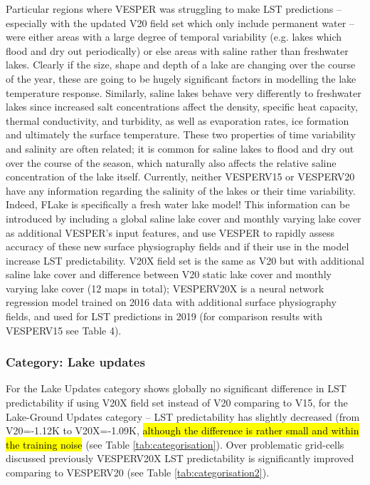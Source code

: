 \documentclass[hess, twostagejnl]{copernicus}
\begin{document}
Particular regions where VESPER was struggling to make LST predictions – especially with the updated V20 field set which only include permanent water – were either areas with a large degree of temporal variability (e.g. lakes which flood and dry out periodically) or else areas with saline rather than freshwater lakes. Clearly if the size, shape and depth of a lake are changing over the course of the year, these are going to be hugely significant factors in modelling the lake temperature response. Similarly, saline lakes behave very differently to freshwater lakes since increased salt concentrations affect the density, specific heat capacity, thermal conductivity, and turbidity, as well as evaporation rates, ice formation and ultimately the surface temperature. These two properties of time variability and salinity are often related; it is common for saline lakes to flood and dry out over the course of the season, which naturally also affects the relative saline concentration of the lake itself.
Currently, neither VESPERV15 or VESPERV20 have any information regarding the salinity of the lakes or their time variability. Indeed, FLake is specifically a fresh water lake model! This information can be introduced by including a global saline lake cover and monthly varying lake cover as additional VESPER’s input features, and use VESPER to rapidly assess accuracy of these new surface physiography fields and if their use in the model increase LST predictability. V20X field set is the same as V20 but with additional saline lake cover and difference between V20 static lake cover and monthly varying lake cover (12 maps in total); VESPERV20X is a neural network regression model trained on 2016 data with additional surface physiography fields, and used for LST predictions in 2019 (for comparison results with VESPERV15 see Table 4).

\subsubsection{Category: Lake updates}

For the Lake Updates category shows globally no significant difference in LST predictability if using V20X field set instead of V20 comparing to V15, for the Lake-Ground Updates category – LST predictability has slightly decreased (from V20=-1.12K to V20X=-1.09K, \hl{although the difference is rather small and within the training noise} (see Table \ref{tab:categorisation}). Over problematic grid-cells discussed previously VESPERV20X LST predictability is significantly improved comparing to VESPERV20 (see Table \ref{tab:categorisation2}). 
\end{document}

